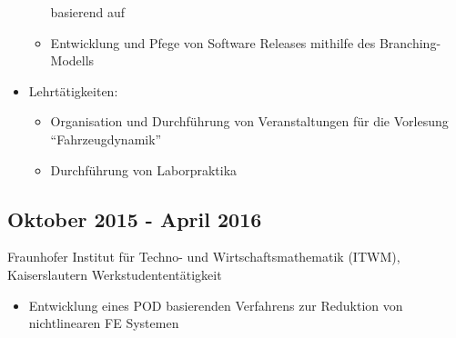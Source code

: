 \documentclass{mycv}
\begin{document}
\begin{paracol}{2}
\begin{itemize}
\begin{itemize}
					basierend auf \href{https://github.com/distcc/distcc}{}
				\item Entwicklung und Pfege von Software Releases mithilfe des
					\href{https://nvie.com/posts/a-successful-git-branching-model/}{}
					Branching-Modells
			\end{itemize}
			\item Lehrt{\"a}tigkeiten:
				\begin{itemize}
					\item Organisation und Durchf{\"u}hrung von Veranstaltungen f{\"u}r
						die Vorlesung ``Fahrzeugdynamik''
					\item Durchf{\"u}hrung von Laborpraktika\\
				\end{itemize}
		\end{itemize}

\subsection{Oktober 2015 - April 2016}{Fraunhofer Institut f{\"u}r Techno-
und Wirtschaftsmathematik (ITWM), Kaiserslautern}
{Werkstudentent{\"a}tigkeit}
	  \begin{itemize}
			\item Entwicklung eines POD basierenden Verfahrens zur Reduktion von 
				nichtlinearen FE Systemen\\
		\end{itemize}

\end{paracol}
\end{document}

